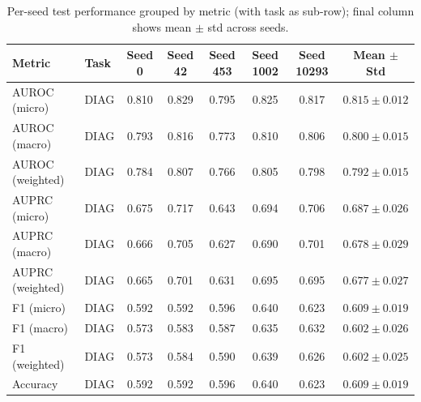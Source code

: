 \begin{table}[h]
\centering
\small
\begin{tabular}{ll|ccccc|c}
\hline
Metric & Task & Seed 0 & Seed 42 & Seed 453 & Seed 1002 & Seed 10293 & Mean $\pm$ Std \\
\hline
AUROC (micro) & DIAG & 0.810 & 0.829 & 0.795 & 0.825 & 0.817 & $0.815 \pm 0.012$ \\
\hline
AUROC (macro) & DIAG & 0.793 & 0.816 & 0.773 & 0.810 & 0.806 & $0.800 \pm 0.015$ \\
\hline
AUROC (weighted) & DIAG & 0.784 & 0.807 & 0.766 & 0.805 & 0.798 & $0.792 \pm 0.015$ \\
\hline
AUPRC (micro) & DIAG & 0.675 & 0.717 & 0.643 & 0.694 & 0.706 & $0.687 \pm 0.026$ \\
\hline
AUPRC (macro) & DIAG & 0.666 & 0.705 & 0.627 & 0.690 & 0.701 & $0.678 \pm 0.029$ \\
\hline
AUPRC (weighted) & DIAG & 0.665 & 0.701 & 0.631 & 0.695 & 0.695 & $0.677 \pm 0.027$ \\
\hline
F1 (micro) & DIAG & 0.592 & 0.592 & 0.596 & 0.640 & 0.623 & $0.609 \pm 0.019$ \\
\hline
F1 (macro) & DIAG & 0.573 & 0.583 & 0.587 & 0.635 & 0.632 & $0.602 \pm 0.026$ \\
\hline
F1 (weighted) & DIAG & 0.573 & 0.584 & 0.590 & 0.639 & 0.626 & $0.602 \pm 0.025$ \\
\hline
Accuracy & DIAG & 0.592 & 0.592 & 0.596 & 0.640 & 0.623 & $0.609 \pm 0.019$ \\
\hline
\end{tabular}
\caption{Per-seed test performance grouped by metric (with task as sub-row); final column shows mean $\pm$ std across seeds.}
\end{table}
